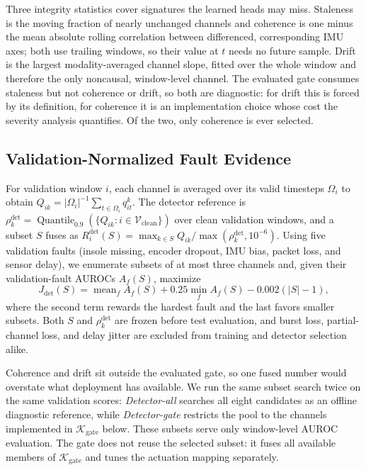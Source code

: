 \documentclass[letterpaper]{article} %
\begin{document}
Three integrity statistics cover signatures the learned heads may miss. Staleness is the moving fraction of nearly unchanged channels and coherence is one minus the mean absolute rolling correlation between differenced, corresponding IMU axes; both use trailing windows, so their value at $t$ needs no future sample. Drift is the largest modality-averaged channel slope, fitted over the whole window and therefore the only noncausal, window-level channel.
The evaluated gate consumes staleness but not coherence or drift, so both are diagnostic: for drift this is forced by its definition, for coherence it is an implementation choice whose cost the severity analysis quantifies. Of the two, only coherence is ever selected.

\subsection{Validation-Normalized Fault Evidence}

For validation window $i$, each channel is averaged over its valid timesteps $\Omega_i$ to obtain $Q_{ik}=|\Omega_i|^{-1}\sum_{t\in\Omega_i}q_{it}^{k}$. The detector reference is $\rho_k^{\mathrm{det}}=\operatorname{Quantile}_{0.9}(\{Q_{ik}:i\in\mathcal{V}_{\mathrm{clean}}\})$ over clean validation windows, and a subset $S$ fuses as $R_i^{\mathrm{det}}(S)=\max_{k\in S}Q_{ik}/\max(\rho_k^{\mathrm{det}},10^{-6})$.
Using five validation faults (insole missing, encoder dropout, IMU bias, packet loss, and sensor delay), we enumerate subsets of at most three channels and, given their validation-fault AUROCs $A_f(S)$, maximize
\begin{equation}
    J_{\mathrm{det}}(S)=\operatorname{mean}_f A_f(S)
    \!+\!0.25\min_f A_f(S)\!-\!0.002(|S|\!-\!1),
\end{equation}
where the second term rewards the hardest fault and the last favors smaller subsets.
Both $S$ and $\rho_k^{\mathrm{det}}$ are frozen before test evaluation, and burst loss, partial-channel loss, and delay jitter are excluded from training and detector selection alike.

Coherence and drift sit outside the evaluated gate, so one fused number would overstate what deployment has available.
We run the same subset search twice on the same validation scores: \emph{Detector-all} searches all eight candidates as an offline diagnostic reference, while \emph{Detector-gate} restricts the pool to the channels implemented in $\mathcal{K}_{\mathrm{gate}}$ below. These subsets serve only window-level AUROC evaluation.
The gate does not reuse the selected subset: it fuses all available members of $\mathcal{K}_{\mathrm{gate}}$ and tunes the actuation mapping separately.
\end{document}
